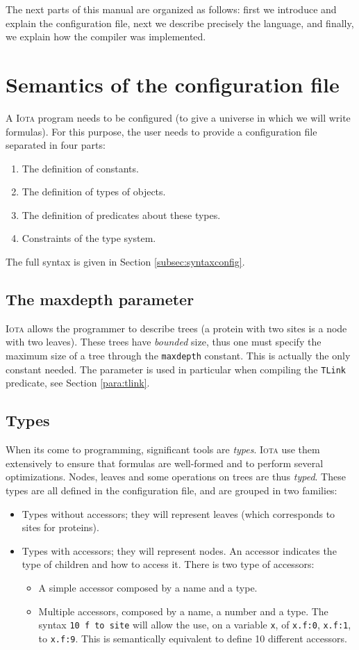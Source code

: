 \documentclass[10pt,a4paper]{article}
\newcommand\Iota{\textsc{Iota}}
\newcommand{\ocaml}{\texttt}
\begin{document}
The next parts of this manual are organized as follows: first we introduce and explain the configuration file, next we describe precisely the language, and finally, we explain how the compiler was implemented.

\section{Semantics of the configuration file}
A \Iota{} program needs to be configured (to give a universe in which we will write formulas). For this purpose, the user needs to provide a configuration file separated in four parts:
\begin{enumerate}
\item The definition of constants.
\item The definition of types of objects.
\item The definition of predicates about these types.
\item Constraints of the type system.
\end{enumerate}

The full syntax is given in Section \ref{subsec:syntaxconfig}.
\subsection{The maxdepth parameter}
\Iota{} allows the programmer to describe trees (a protein with two sites is a node with two leaves). These trees have \emph{bounded} size, thus one must specify the maximum size of a tree through the \ocaml{maxdepth} constant. This is actually the only constant needed.
The parameter is used in particular when compiling the \ocaml{TLink} predicate, see Section \ref{para:tlink}.

\subsection{Types}
When its come to programming, significant tools are \emph{types}. \Iota{} use them extensively to ensure that formulas are well-formed and to perform several optimizations.
Nodes, leaves and some operations on trees are thus \emph{typed}. These types are all defined in the configuration file, and are grouped in two families:
\begin{itemize}
\item Types without accessors; they will represent leaves (which corresponds to sites for proteins).
\item Types with accessors; they will represent nodes. An accessor indicates the type of children and how to access it. There is two type of accessors:
  \begin{itemize}
  \item A simple accessor composed by a name and a type.
  \item Multiple accessors, composed by a name, a number and a type. The syntax \ocaml{10 f to site} will allow the use, on a variable \ocaml{x}, of \ocaml{x.f:0}, \ocaml{x.f:1}, to \ocaml{x.f:9}. This is semantically equivalent to define 10 different accessors.
  \end{itemize}
\end{itemize}
\end{document}
